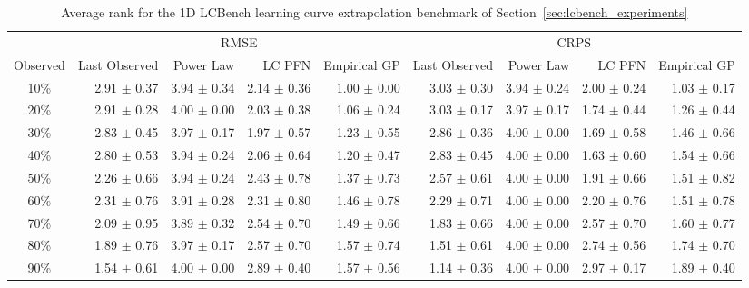 \documentclass{article}
\begin{document}
\begin{table}[h]
\small
\centering
\setlength{\tabcolsep}{4pt}
\caption{Average rank for the 1D LCBench learning curve extrapolation benchmark of Section~\ref{sec:lcbench_experiments}}
\label{tab:results_avg_rank_lc_extrapolation}
\begin{tabular}{c*{8}{r}}
\toprule
 & \multicolumn{4}{c}{RMSE} & \multicolumn{4}{c}{CRPS} \\
\cmidrule(lr){2-5} \cmidrule(lr){6-9}
Observed & Last Observed & Power Law & LC PFN & Empirical GP & Last Observed & Power Law & LC PFN & Empirical GP \\
\midrule
10\% & 2.91 $\pm$ 0.37 & 3.94 $\pm$ 0.34 & 2.14 $\pm$ 0.36 & 1.00 $\pm$ 0.00 & 3.03 $\pm$ 0.30 & 3.94 $\pm$ 0.24 & 2.00 $\pm$ 0.24 & 1.03 $\pm$ 0.17 \\
20\% & 2.91 $\pm$ 0.28 & 4.00 $\pm$ 0.00 & 2.03 $\pm$ 0.38 & 1.06 $\pm$ 0.24 & 3.03 $\pm$ 0.17 & 3.97 $\pm$ 0.17 & 1.74 $\pm$ 0.44 & 1.26 $\pm$ 0.44 \\
30\% & 2.83 $\pm$ 0.45 & 3.97 $\pm$ 0.17 & 1.97 $\pm$ 0.57 & 1.23 $\pm$ 0.55 & 2.86 $\pm$ 0.36 & 4.00 $\pm$ 0.00 & 1.69 $\pm$ 0.58 & 1.46 $\pm$ 0.66 \\
40\% & 2.80 $\pm$ 0.53 & 3.94 $\pm$ 0.24 & 2.06 $\pm$ 0.64 & 1.20 $\pm$ 0.47 & 2.83 $\pm$ 0.45 & 4.00 $\pm$ 0.00 & 1.63 $\pm$ 0.60 & 1.54 $\pm$ 0.66 \\
50\% & 2.26 $\pm$ 0.66 & 3.94 $\pm$ 0.24 & 2.43 $\pm$ 0.78 & 1.37 $\pm$ 0.73 & 2.57 $\pm$ 0.61 & 4.00 $\pm$ 0.00 & 1.91 $\pm$ 0.66 & 1.51 $\pm$ 0.82 \\
60\% & 2.31 $\pm$ 0.76 & 3.91 $\pm$ 0.28 & 2.31 $\pm$ 0.80 & 1.46 $\pm$ 0.78 & 2.29 $\pm$ 0.71 & 4.00 $\pm$ 0.00 & 2.20 $\pm$ 0.76 & 1.51 $\pm$ 0.78 \\
70\% & 2.09 $\pm$ 0.95 & 3.89 $\pm$ 0.32 & 2.54 $\pm$ 0.70 & 1.49 $\pm$ 0.66 & 1.83 $\pm$ 0.66 & 4.00 $\pm$ 0.00 & 2.57 $\pm$ 0.70 & 1.60 $\pm$ 0.77 \\
80\% & 1.89 $\pm$ 0.76 & 3.97 $\pm$ 0.17 & 2.57 $\pm$ 0.70 & 1.57 $\pm$ 0.74 & 1.51 $\pm$ 0.61 & 4.00 $\pm$ 0.00 & 2.74 $\pm$ 0.56 & 1.74 $\pm$ 0.70 \\
90\% & 1.54 $\pm$ 0.61 & 4.00 $\pm$ 0.00 & 2.89 $\pm$ 0.40 & 1.57 $\pm$ 0.56 & 1.14 $\pm$ 0.36 & 4.00 $\pm$ 0.00 & 2.97 $\pm$ 0.17 & 1.89 $\pm$ 0.40 \\
\bottomrule
\end{tabular}
\end{table}
\end{document}
